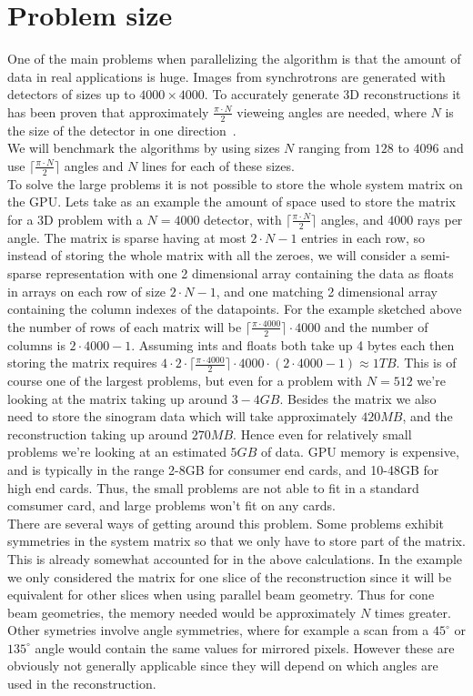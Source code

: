 \section{Problem size}
One of the main problems when parallelizing the algorithm is that the amount of data in real applications is huge. Images from synchrotrons are generated with detectors of sizes up to $4000\times4000$. To accurately generate 3D reconstructions it has been proven that approximately $\frac{\pi\cdot N}{2}$ vieweing angles are needed, where $N$ is the size of the detector in one direction~\cite{natterer2001}.\\
We will benchmark the algorithms by using sizes $N$ ranging from $128$ to $4096$  and use $\lceil\frac{\pi\cdot N}{2}\rceil$ angles and $N$ lines for each of these sizes.\\
To solve the large problems it is not possible to store the whole system matrix on the GPU. Lets take as an example the amount of space used to store the matrix for a 3D problem with a $N=4000$ detector, with $\lceil\frac{\pi\cdot N}{2}\rceil$ angles, and $4000$ rays per angle. The matrix is sparse having at most $2\cdot N-1$ entries in each row, so instead of storing the whole matrix with all the zeroes, we will consider a semi-sparse representation with one 2 dimensional array containing the data as floats in arrays on each row of size  $2\cdot N-1$, and one matching 2 dimensional array containing the column indexes of the datapoints. For the example sketched above the number of rows of each matrix will be $\lceil\frac{\pi\cdot4000}{2}\rceil\cdot4000$ and the number of columns is $2\cdot 4000-1$. Assuming ints and floats both take up 4 bytes each then storing the matrix requires $4\cdot 2\cdot\lceil\frac{\pi\cdot 4000}{2}\rceil\cdot4000\cdot(2\cdot 4000-1)\approx1TB$. This is of course one of the largest problems, but even for a problem with $N=512$ we're looking at the matrix taking up around $3-4GB$. Besides the matrix we also need to store the sinogram data which will take approximately $420MB$, and the reconstruction taking up around $270MB$. Hence even for relatively small problems we're looking at an estimated $5GB$ of data. GPU memory is expensive, and is typically in the range 2-8GB for consumer end cards, and 10-48GB for high end cards. Thus, the small problems are not able to fit in a standard comsumer card, and large problems won't fit on any cards.\\
There are several ways of getting around this problem. Some problems exhibit symmetries in the system matrix so that we only have to store part of the matrix. This is already somewhat accounted for in the above calculations. In the example we only considered the matrix for one slice of the reconstruction since it will be equivalent for other slices when using parallel beam geometry. Thus for cone beam geometries, the memory needed would be approximately $N$ times greater. Other symetries involve angle symmetries, where for example a scan from a $45^{\circ}$ or $135^{\circ}$ angle would contain the same values for mirrored pixels. However these are obviously not generally applicable since they will depend on which angles are used in the reconstruction.\\
